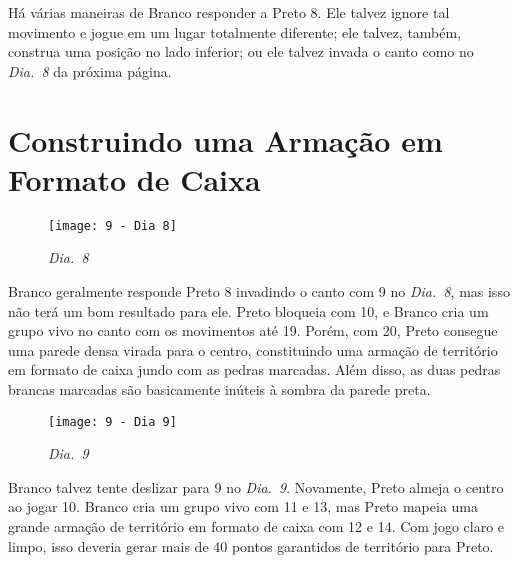 Há várias maneiras de Branco responder a Preto 8. Ele talvez ignore tal movimento e jogue em um lugar totalmente diferente; ele talvez, também, construa uma posição no lado inferior; ou ele talvez invada o canto como no \emph{Dia.\@~8} da próxima página.

\pagebreak

\section{Construindo uma Armação em Formato de Caixa}

\begin{wrapfigure}{r}{60mm}
    \vspace{-27.5pt}
    \begin{center}
        \texttt{[image: 9 - Dia 8]}
        \captionsetup{justification=centering}
        \caption*{\emph{Dia.\@~8}}
    \end{center}
    \vspace{-32.5pt}
\end{wrapfigure}

Branco geralmente responde Preto 8 invadindo o canto com 9 no \emph{Dia.\@~8}, mas isso não terá um bom resultado para ele. Preto bloqueia com 10, e Branco cria um grupo vivo no canto com os movimentos até 19. Porém, com 20, Preto consegue uma parede densa virada para o centro, constituindo uma armação de território em formato de caixa jundo com as pedras marcadas. Além disso, as duas pedras brancas marcadas são basicamente inúteis à sombra da parede preta.

\begin{wrapfigure}{l}{60mm}
    \vspace{-27.5pt}
    \begin{center}
        \texttt{[image: 9 - Dia 9]}
        \captionsetup{justification=centering}
        \caption*{\emph{Dia.\@~9}}
    \end{center}
    \vspace{-80pt}
\end{wrapfigure}

\bigskip

Branco talvez tente deslizar  para 9 no \emph{Dia.\@~9}. Novamente, Preto almeja o centro ao jogar 10. Branco cria um grupo vivo com 11 e 13, mas Preto mapeia uma grande armação de território em formato de caixa com 12 e 14. Com jogo claro e limpo, isso deveria gerar mais de 40 pontos garantidos de território para Preto.

